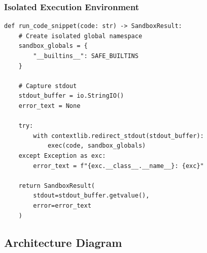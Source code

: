 \documentclass[12pt,a4paper]{article}
\begin{document}
\subsubsection{Isolated Execution Environment}

\begin{lstlisting}[caption=Sandbox Execution Implementation]
def run_code_snippet(code: str) -> SandboxResult:
    # Create isolated global namespace
    sandbox_globals = {
        "__builtins__": SAFE_BUILTINS
    }
    
    # Capture stdout
    stdout_buffer = io.StringIO()
    error_text = None
    
    try:
        with contextlib.redirect_stdout(stdout_buffer):
            exec(code, sandbox_globals)
    except Exception as exc:
        error_text = f"{exc.__class__.__name__}: {exc}"
    
    return SandboxResult(
        stdout=stdout_buffer.getvalue(),
        error=error_text
    )
\end{lstlisting}

\subsection{Architecture Diagram}
\end{document}
